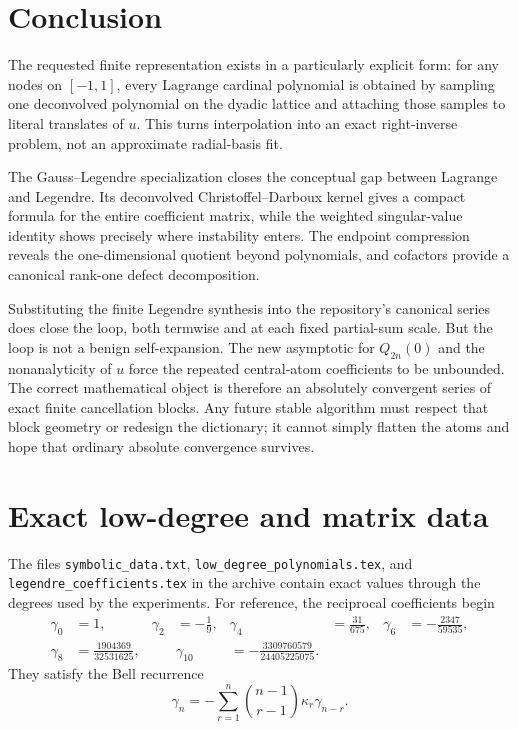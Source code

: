 \documentclass[11pt]{article}
\theoremstyle{definition}
\theoremstyle{remark}
\begin{document}
\section{Conclusion}
\label{sec:conclusion}

The requested finite representation exists in a particularly explicit form:
for any nodes on $[-1,1]$, every Lagrange cardinal polynomial is obtained by
sampling one deconvolved polynomial on the dyadic lattice and attaching those
samples to literal translates of $u$.  This turns interpolation into an exact
right-inverse problem, not an approximate radial-basis fit.

The Gauss--Legendre specialization closes the conceptual gap between Lagrange
and Legendre.  Its deconvolved Christoffel--Darboux kernel gives a compact
formula for the entire coefficient matrix, while the weighted singular-value
identity shows precisely where instability enters.  The endpoint compression
reveals the one-dimensional quotient beyond polynomials, and cofactors provide
a canonical rank-one defect decomposition.

Substituting the finite Legendre synthesis into the repository's canonical
series does close the loop, both termwise and at each fixed partial-sum scale.
But the loop is not a benign self-expansion.  The new asymptotic for
$Q_{2n}(0)$ and the nonanalyticity of $u$ force the repeated central-atom
coefficients to be unbounded.  The correct mathematical object is therefore an
absolutely convergent series of exact finite cancellation blocks.  Any future
stable algorithm must respect that block geometry or redesign the dictionary;
it cannot simply flatten the atoms and hope that ordinary absolute convergence
survives.

\appendix

\section{Exact low-degree and matrix data}
\label{app:data}

The files \texttt{symbolic\_data.txt},
\texttt{low\_degree\_polynomials.tex}, and
\texttt{legendre\_coefficients.tex} in the archive contain exact values through
the degrees used by the experiments.  For reference, the reciprocal
coefficients begin
\begin{align*}
 \gamma_0&=1,&
 \gamma_2&=-\frac19,&
 \gamma_4&=\frac{31}{675},&
 \gamma_6&=-\frac{2347}{59535},\\
 \gamma_8&=\frac{1904369}{32531625},&&
 \gamma_{10}&=-\frac{3309760579}{24405225075}.&&
\end{align*}
They satisfy the Bell recurrence
\begin{equation}
 \gamma_n=-\sum_{r=1}^{n}\binom{n-1}{r-1}\kappa_r\gamma_{n-r}.
 \label{eq:gamma-recurrence}
\end{equation}
\end{document}

